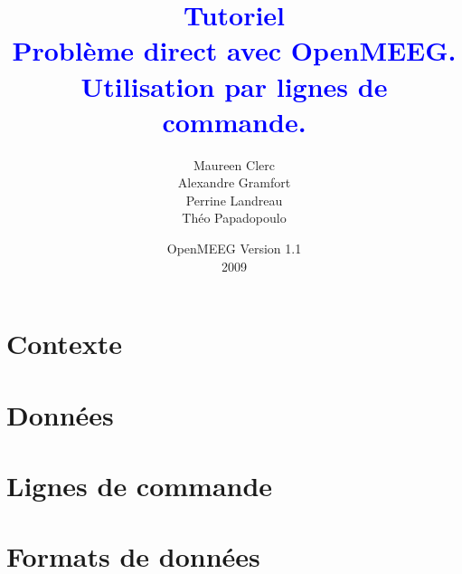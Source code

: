 \documentclass[11pt,a4paper,makeidx]{book}
\title{{\textbf{\textcolor{blue}{Tutoriel\\
        {\Large Problème direct avec OpenMEEG.\\
                Utilisation par lignes de commande.}}}}}
\author{Maureen Clerc\\Alexandre Gramfort \\
        Perrine Landreau\\Théo Papadopoulo}
\date{OpenMEEG Version 1.1\\2009}
\begin{document}
    \maketitle
    \tableofcontents

    \chapter{Contexte}
    

    \chapter{Données}
    

    \chapter{Lignes de commande}
    

    \appendix
    \chapter{Formats de données}
	\label{chap:formats}
    
\end{document}
